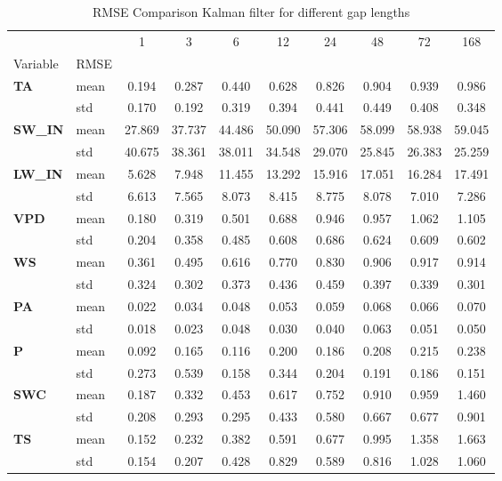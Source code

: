 \begin{table}
\centering
\caption{RMSE Comparison Kalman filter for different gap lengths}
\label{gap_len}
\begin{tabular}{p{2.1cm}l|cccccccc}
\toprule
 &  & 1 & 3 & 6 & 12 & 24 & 48 & 72 & 168 \\
Variable & RMSE &  &  &  &  &  &  &  &  \\
\midrule
\multirow[c]{2}{*}{\parbox{2.1cm}{\textbf{TA}}} & mean & 0.194 & 0.287 & 0.440 & 0.628 & 0.826 & 0.904 & 0.939 & 0.986 \\
 & std & 0.170 & 0.192 & 0.319 & 0.394 & 0.441 & 0.449 & 0.408 & 0.348 \\
\cline{1-10}
\multirow[c]{2}{*}{\parbox{2.1cm}{\textbf{SW\_IN}}} & mean & 27.869 & 37.737 & 44.486 & 50.090 & 57.306 & 58.099 & 58.938 & 59.045 \\
 & std & 40.675 & 38.361 & 38.011 & 34.548 & 29.070 & 25.845 & 26.383 & 25.259 \\
\cline{1-10}
\multirow[c]{2}{*}{\parbox{2.1cm}{\textbf{LW\_IN}}} & mean & 5.628 & 7.948 & 11.455 & 13.292 & 15.916 & 17.051 & 16.284 & 17.491 \\
 & std & 6.613 & 7.565 & 8.073 & 8.415 & 8.775 & 8.078 & 7.010 & 7.286 \\
\cline{1-10}
\multirow[c]{2}{*}{\parbox{2.1cm}{\textbf{VPD}}} & mean & 0.180 & 0.319 & 0.501 & 0.688 & 0.946 & 0.957 & 1.062 & 1.105 \\
 & std & 0.204 & 0.358 & 0.485 & 0.608 & 0.686 & 0.624 & 0.609 & 0.602 \\
\cline{1-10}
\multirow[c]{2}{*}{\parbox{2.1cm}{\textbf{WS}}} & mean & 0.361 & 0.495 & 0.616 & 0.770 & 0.830 & 0.906 & 0.917 & 0.914 \\
 & std & 0.324 & 0.302 & 0.373 & 0.436 & 0.459 & 0.397 & 0.339 & 0.301 \\
\cline{1-10}
\multirow[c]{2}{*}{\parbox{2.1cm}{\textbf{PA}}} & mean & 0.022 & 0.034 & 0.048 & 0.053 & 0.059 & 0.068 & 0.066 & 0.070 \\
 & std & 0.018 & 0.023 & 0.048 & 0.030 & 0.040 & 0.063 & 0.051 & 0.050 \\
\cline{1-10}
\multirow[c]{2}{*}{\parbox{2.1cm}{\textbf{P}}} & mean & 0.092 & 0.165 & 0.116 & 0.200 & 0.186 & 0.208 & 0.215 & 0.238 \\
 & std & 0.273 & 0.539 & 0.158 & 0.344 & 0.204 & 0.191 & 0.186 & 0.151 \\
\cline{1-10}
\multirow[c]{2}{*}{\parbox{2.1cm}{\textbf{SWC}}} & mean & 0.187 & 0.332 & 0.453 & 0.617 & 0.752 & 0.910 & 0.959 & 1.460 \\
 & std & 0.208 & 0.293 & 0.295 & 0.433 & 0.580 & 0.667 & 0.677 & 0.901 \\
\cline{1-10}
\multirow[c]{2}{*}{\parbox{2.1cm}{\textbf{TS}}} & mean & 0.152 & 0.232 & 0.382 & 0.591 & 0.677 & 0.995 & 1.358 & 1.663 \\
 & std & 0.154 & 0.207 & 0.428 & 0.829 & 0.589 & 0.816 & 1.028 & 1.060 \\
\cline{1-10}
\bottomrule
\end{tabular}
\end{table}
